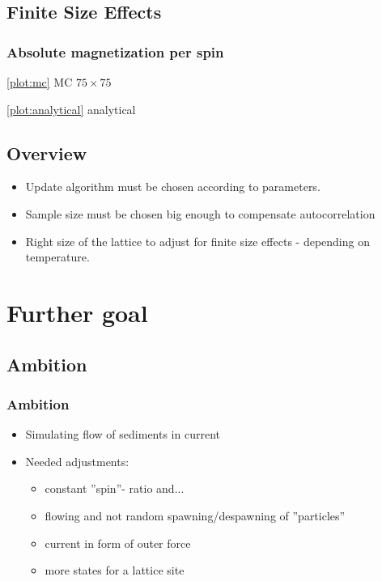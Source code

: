 \documentclass{beamer}
\begin{document}
\subsection{Finite Size Effects}
\begin{frame}%
\frametitle{Absolute magnetization per spin}
\begin{minipage}{0.70\textwidth}

\end{minipage}\begin{minipage}{0.25\textwidth}

\ref{plot:mc} MC $75\times 75$

\ref{plot:analytical} analytical
\end{minipage}
\end{frame}

\subsection{Overview}
\begin{frame}
\begin{itemize}
\item Update algorithm must be chosen according to parameters.
\item Sample size must be chosen big enough to compensate autocorrelation
\item Right size of the lattice to adjust for finite size effects - depending on temperature.
\end{itemize}
\end{frame}

\section{Further goal}
\subsection{Ambition}
\begin{frame}
\frametitle{Ambition}
\begin{itemize}
\item Simulating flow of sediments in current
\item Needed adjustments:
\begin{itemize}
\item constant ''spin''- ratio and... 
\item flowing and not random spawning/despawning of ''particles''
\item current in form of outer force  
\item more states for a lattice site 
\end{itemize}
\end{itemize}
\end{frame}
\end{document}
